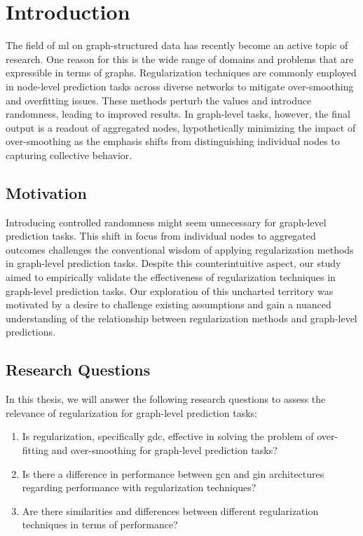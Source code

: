\chapter{Introduction}%
\label{sec:intro}

\setcounter{page}{1}			%

The field of \acs{ml} on graph-structured data has recently become an active topic of research.
One reason for this is the wide range of domains and problems that are expressible in terms of graphs.
Regularization techniques are commonly employed in node-level prediction tasks across diverse networks to mitigate over-smoothing and overfitting issues.
These methods perturb the values and introduce randomness, leading to improved results.
In graph-level tasks, however, the final output is a readout of aggregated nodes, hypothetically minimizing the impact of over-smoothing as the emphasis shifts from distinguishing individual nodes to capturing collective behavior.


\section{Motivation}%
\label{sec:intro:motivation}
Introducing controlled randomness might seem unnecessary for graph-level prediction tasks.
This shift in focus from individual nodes to aggregated outcomes challenges the conventional wisdom of applying regularization methods in graph-level prediction tasks.
Despite this counterintuitive aspect, our study aimed to empirically validate the effectiveness of regularization techniques in graph-level prediction tasks.
Our exploration of this uncharted territory was motivated by a desire to challenge existing assumptions and gain a nuanced understanding of the relationship between regularization methods and graph-level predictions.

\section{Research Questions}%
\label{sec:intro:questions}
In this thesis, we will answer the following research questions to assess the relevance of regularization for graph-level prediction tasks:
\begin{enumerate}
    \item Is regularization, specifically \ac{gdc}, effective in solving the problem of over-fitting and over-smoothing for graph-level prediction tasks?
    \item Is there a difference in performance between \ac{gcn} and \ac{gin} architectures regarding performance with regularization techniques?
    \item Are there similarities and differences between different regularization techniques in terms of performance?
\end{enumerate}

